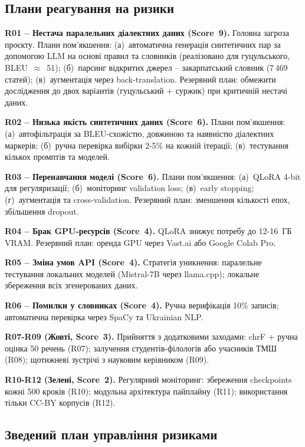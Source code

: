 \documentclass[14pt]{extarticle}
\begin{document}
\subsection{Плани реагування на ризики}

\textbf{R01 -- Нестача паралельних діалектних даних (Score~9).}
Головна загроза проєкту. Плани пом'якшення: (а)~автоматична генерація синтетичних пар за допомогою LLM на основі правил та словників (реалізовано для гуцульського, BLEU~$\approx$~51); (б)~парсинг відкритих джерел -- закарпатський словник (7\,469 статей); (в)~аугментація через back-translation. Резервний план: обмежити дослідження до двох варіантів (гуцульський + суржик) при критичній нестачі даних.

\textbf{R02 -- Низька якість синтетичних даних (Score~6).}
Плани пом'якшення: (а)~авто\-фільтрація за BLEU-схожістю, довжиною та наявністю діалектних маркерів; (б)~ручна перевірка вибірки 2-5\% на кожній ітерації; (в)~тестування кількох промптів та моделей.

\textbf{R03 -- Перенавчання моделі (Score~6).}
Плани пом'якшення: (а)~QLoRA 4-bit для регуляризації; (б)~моніторинг validation loss; (в)~early stopping; (г)~аугментація та cross-validation. Резервний план: зменшення кількості епох, збільшення dropout.

\textbf{R04 -- Брак GPU-ресурсів (Score~4).} QLoRA знижує потребу до 12-16~ГБ VRAM. Резервний план: оренда GPU через Vast.ai або Google Colab Pro.

\textbf{R05 -- Зміна умов API (Score~4).} Стратегія уникнення: паралельне тестування локальних моделей (Mistral-7B через llama.cpp); локальне збереження всіх згенерованих даних.

\textbf{R06 -- Помилки у словниках (Score~4).} Ручна верифікація 10\% записів; автоматична перевірка через SpaCy та Ukrainian NLP.

\textbf{R07-R09 (Жовті, Score~3).} Прийняття з додатковими заходами: chrF + ручна оцінка 50 речень (R07); залучення студентів-філологів або учасників ТМШ (R08); щотижневі зустрічі з науковим керівником (R09).

\textbf{R10-R12 (Зелені, Score~2).} Регулярний моніторинг: збереження checkpoints кожні 500 кроків (R10); модульна архітектура пайплайну (R11); використання тільки CC-BY корпусів (R12).

\subsection{Зведений план управління ризиками}
\end{document}
